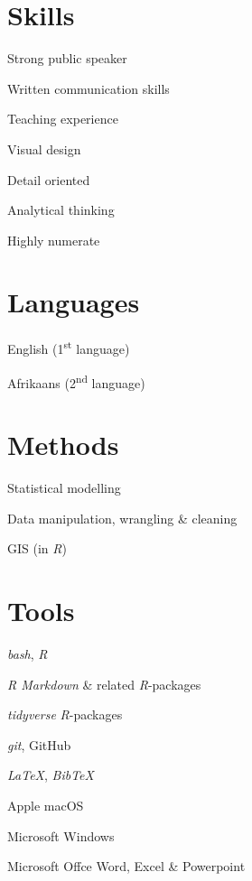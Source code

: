 \documentclass[10pt]{article}
\begin{document}
\begin{multicols}{2}

\section*{Skills} %

Strong public speaker

Written communication skills

Teaching experience

Visual design

Detail oriented

Analytical thinking

Highly numerate

\section*{Languages} %

English (1\textsuperscript{st} language)

Afrikaans (2\textsuperscript{nd} language)

\section*{Methods} %

Statistical modelling

Data manipulation, wrangling \& cleaning

GIS (in \textit{R})

\columnbreak

\section*{Tools} %

\textit{bash}, \textit{R}

\textit{R Markdown} \& related \textit{R}-packages

\textit{tidyverse} \textit{R}-packages

\textit{git}, GitHub

\textit{LaTeX}, \textit{BibTeX}

Apple macOS

Microsoft Windows

Microsoft Offce Word, Excel \& Powerpoint

\end{multicols}
\end{document}
